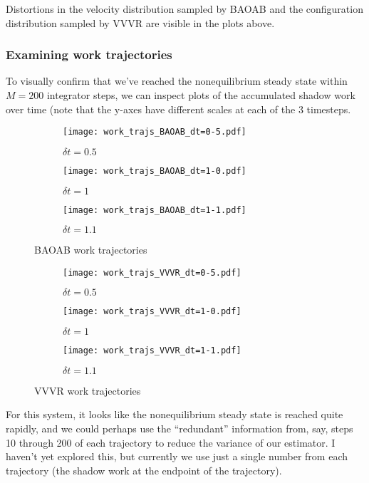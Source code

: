 \documentclass[11pt]{article}
\begin{document}
Distortions in the velocity distribution sampled by BAOAB and the configuration distribution sampled by VVVR are visible in the plots above.


\subsubsection{Examining work trajectories}
To visually confirm that we've reached the nonequilibrium steady state within $M=200$ integrator steps, we can inspect plots of the accumulated shadow work over time (note that the y-axes have different scales at each of the 3 timesteps.
\begin{figure}[h] %
    \centering
    \begin{subfigure}[b]{0.3\textwidth}
        \texttt{[image: work\_trajs\_BAOAB\_dt=0-5.pdf]}
        \caption{$\delta t = 0.5$}
    \end{subfigure}
    \begin{subfigure}[b]{0.3\textwidth}
        \texttt{[image: work\_trajs\_BAOAB\_dt=1-0.pdf]}
        \caption{$\delta t = 1$}
    \end{subfigure}
    \begin{subfigure}[b]{0.3\textwidth}
        \texttt{[image: work\_trajs\_BAOAB\_dt=1-1.pdf]}
        \caption{$\delta t = 1.1$}
    \end{subfigure}
    \caption{BAOAB work trajectories}
\end{figure}

\begin{figure}[h] %
    \centering
    \begin{subfigure}[b]{0.3\textwidth}
        \texttt{[image: work\_trajs\_VVVR\_dt=0-5.pdf]}
        \caption{$\delta t = 0.5$}
    \end{subfigure}
    \begin{subfigure}[b]{0.3\textwidth}
        \texttt{[image: work\_trajs\_VVVR\_dt=1-0.pdf]}
        \caption{$\delta t = 1$}
    \end{subfigure}
    \begin{subfigure}[b]{0.3\textwidth}
        \texttt{[image: work\_trajs\_VVVR\_dt=1-1.pdf]}
        \caption{$\delta t = 1.1$}
    \end{subfigure}
    \caption{VVVR work trajectories}
\end{figure}

For this system, it looks like the nonequilibrium steady state is reached quite rapidly, and we could perhaps use the ``redundant'' information from, say, steps 10 through 200 of each trajectory to reduce the variance of our estimator.
I haven't yet explored this, but currently we use just a single number from each trajectory (the shadow work at the endpoint of the trajectory).
\end{document}
